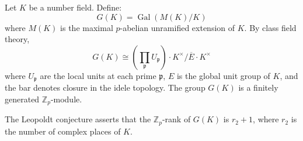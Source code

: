 Let $K$ be a number field. Define:
$$G(K) = \operatorname{Gal}(M(K)/K)$$
where $M(K)$ is the maximal $p$-abelian unramified extension of $K$. By class field theory,
$$G(K) \cong \left(\prod_{\mathfrak{p}} U_{\mathfrak{p}}\right) \cdot K^{\times} \Big/ \overline{E} \cdot K^{\times}$$
where $U_{\mathfrak{p}}$ are the local units at each prime $\mathfrak{p}$, $E$ is the global unit group of $K$, and the bar denotes closure in the idele topology. The group $G(K)$ is a finitely generated $\mathbb{Z}_p$-module.

The Leopoldt conjecture asserts that the $\mathbb{Z}_p$-rank of $G(K)$ is $r_2 + 1$, where $r_2$ is the number of complex places of $K$.
